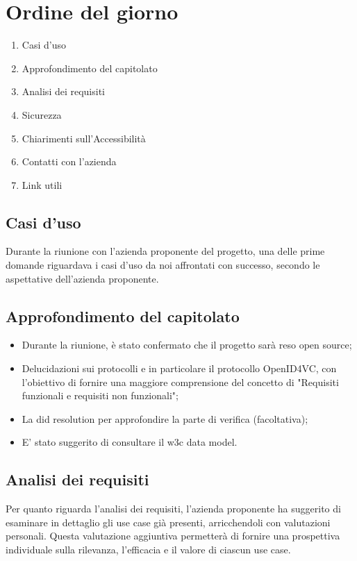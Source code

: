 \section{Ordine del giorno}
\begin{enumerate}
\item Casi d'uso
\item Approfondimento del capitolato
\item Analisi dei requisiti
\item Sicurezza
\item Chiarimenti sull'Accessibilità
\item Contatti con l'azienda 
\item Link utili
\end{enumerate}

\subsection{Casi d'uso}
Durante la riunione con l'azienda proponente del progetto, una delle prime domande riguardava i casi d'uso da noi affrontati con successo, 
secondo le aspettative dell'azienda proponente.


\subsection{Approfondimento del capitolato}
\begin{itemize}
    \item Durante la riunione, è stato confermato che il progetto sarà reso open source;
    \item Delucidazioni sui protocolli e in particolare il protocollo OpenID4VC, con l’obiettivo di fornire una maggiore comprensione del concetto di "Requisiti funzionali e requisiti non funzionali";
    \item La did resolution per approfondire la parte di verifica (facoltativa);
    \item E' stato suggerito di consultare il w3c data model.
\end{itemize}



\subsection{Analisi dei requisiti}
Per quanto riguarda l'analisi dei requisiti, l'azienda proponente ha suggerito di esaminare in dettaglio gli use case già presenti, arricchendoli con valutazioni personali. Questa valutazione aggiuntiva permetterà di fornire una prospettiva individuale sulla rilevanza, l'efficacia e il valore di ciascun use case.


